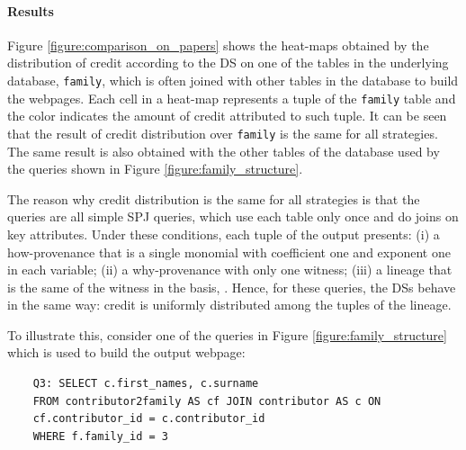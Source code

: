 \paragraph{Results} Figure \ref{figure:comparison_on_papers} shows the heat-maps obtained by the distribution of credit according to the  DS on one of the tables in the underlying database, \texttt{family}, 
which is often joined with other tables in the database to build the webpages. Each cell in a heat-map represents a tuple of the \texttt{family} table and the color indicates the amount of credit attributed to such tuple.
It can be seen that the result of  credit distribution over \texttt{family} is the same for all  strategies. The same result is also obtained with the other tables of the database used by the queries shown in Figure \ref{figure:family_structure}. 

The reason why credit distribution is the same for all  strategies is that the queries are all simple SPJ queries, which use each table only once and do joins on key attributes. 
Under these conditions, each tuple of the output presents: (i) a how-provenance that is a single monomial with coefficient one and exponent one in each variable; (ii) a why-provenance with only one witness; (iii) a lineage that is the same of the witness in the basis, .
Hence, for these queries, the  DSs behave in the same way: credit is uniformly distributed among the tuples of the lineage. 

To illustrate this, consider one of the queries in Figure \ref{figure:family_structure} which is used to build the output webpage:

\vspace{2mm}
{\footnotesize
\begin{adjustwidth}{25pt}{5pt}
	\begin{verbatim}
	Q3: SELECT c.first_names, c.surname
	FROM contributor2family AS cf JOIN contributor AS c ON 
	cf.contributor_id = c.contributor_id 
	WHERE f.family_id = 3
\end{verbatim}
\end{adjustwidth}
}
\vspace{2mm}

